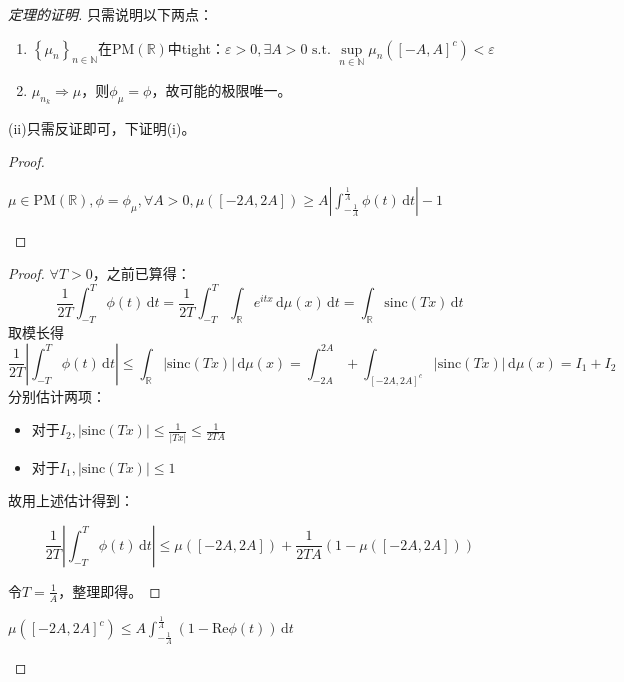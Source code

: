 \documentclass{ctexart}
\begin{document}
\begin{proof}[定理的证明]
  只需说明以下两点：
\begin{enumerate}
\item $\left\{ \mu_n \right\}_{n\in \mathbb{N}}$在$\mathrm{PM}(\mathbb{R})$中tight：$\varepsilon>0, \exists A>0 \text{ s.t. } \sup\limits_{n\in \mathbb{N}}\mu_n(\left[ -A,A \right]^c)<\varepsilon$
\item $\mu_{n_k}\Rightarrow \mu$，则$\phi_{\mu}=\phi$，故可能的极限唯一。
\end{enumerate}

(ii)只需反证即可，下证明(i)。

\begin{proof}
  \begin{Lemma}
    $\mu\in \mathrm{PM}(\mathbb{R}), \phi=\phi_{\mu}, \forall A>0, \mu(\left[ -2A,2A \right])\geq A\left| \int_{-\frac{1}{A}}^{\frac{1}{A}}\phi(t)  \,\mathrm{d}t \right|-1$
  \end{Lemma}
\end{proof}
\begin{proof}
  $\forall T>0$，之前已算得：
  \[ \frac{1}{2T}\int_{-T}^{T} \phi(t) \,\mathrm{d}t=\frac{1}{2T}\int_{-T}^{T} \int_{\mathbb{R}}^{}e^{itx}  \,\mathrm{d}\mu(x) \,\mathrm{d}t= \int_{\mathbb{R}}^{} \mathrm{sinc}(Tx)  \,\mathrm{d}t\]
取模长得
\[\frac{1}{2T}|\int_{-T}^{T} \phi(t) \,\mathrm{d}t|\leq \int_{\mathbb{R}}^{}|\mathrm{sinc}(Tx)|  \,\mathrm{d}\mu(x)= \int_{-2A}^{2A} +\int_{[-2A,2A]^c}| \mathrm{sinc}(Tx)| \,\mathrm{d}\mu(x)= I_1+I_2\]
分别估计两项：
\begin{itemize}
\item 对于$I_2, | \mathrm{sinc}(Tx)|\leq \frac{1}{|Tx|}\leq \frac{1}{2TA}$
\item 对于$I_1, | \mathrm{sinc}(Tx)|\leq 1$
\end{itemize}
故用上述估计得到：

\begin{equation*}
\frac{1}{2T}\left| \int_{-T}^{T}  \phi(t) \,\mathrm{d}t \right| \leq \mu(\left[ -2A,2A \right])+\frac{1}{2TA}(1-\mu(\left[ -2A,2A \right]))
\end{equation*}

令$T=\frac{1}{A}$，整理即得。
\end{proof}

\begin{Rmk}
$\mu(\left[ -2A,2A \right]^c)\leq A \int_{-\frac{1}{A}}^{\frac{1}{A}} (1- \mathrm{Re} \phi(t))  \,\mathrm{d}t$  
\end{Rmk}


\end{proof}
\end{document}
